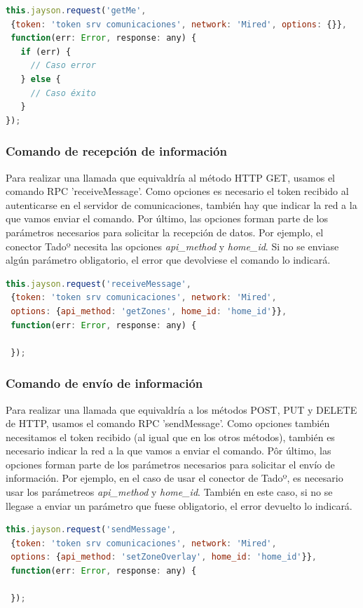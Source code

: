 \documentclass[spanish,12pt, a4paper, twoside]{paper}
\begin{document}
\begin{lstlisting}[language=Javascript]
this.jayson.request('getMe',
 {token: 'token srv comunicaciones', network: 'Mired', options: {}}, 
 function(err: Error, response: any) {
   if (err) {
     // Caso error
   } else {
     // Caso éxito
   }
});
\end{lstlisting}

\subsubsection{Comando de recepción de información}

Para realizar una llamada que equivaldría al método HTTP GET, usamos el comando RPC 'receiveMessage'. Como opciones es necesario el token recibido al autenticarse en el servidor de comunicaciones, también hay que indicar la red a la que vamos enviar el comando. Por último, las opciones forman parte de los parámetros necesarios para solicitar la recepción de datos. Por ejemplo, el conector Tadoº necesita las opciones \emph{api\_method} y \emph{home\_id}. Si no se enviase algún parámetro obligatorio, el error que devolviese el comando lo indicará.

\begin{lstlisting}[language=Javascript]
this.jayson.request('receiveMessage',
 {token: 'token srv comunicaciones', network: 'Mired',
 options: {api_method: 'getZones', home_id: 'home_id'}}, 
 function(err: Error, response: any) {
 
 });
\end{lstlisting}

\subsubsection{Comando de envío de información}

Para realizar una llamada que equivaldría a los métodos POST, PUT y DELETE de HTTP, usamos el comando RPC 'sendMessage'. Como opciones también necesitamos el token recibido (al igual que en los otros métodos), también es necesario indicar la red a la que vamos a enviar el comando. Pôr último, las opciones forman parte de los parámetros necesarios para solicitar el envío de información. Por ejemplo, en el caso de usar el conector de Tadoº, es necesario usar los parámetreos \emph{api\_method} y \emph{home\_id}. También en este caso, si no se llegase a enviar un parámetro que fuese obligatorio, el error devuelto lo indicará.

\begin{lstlisting}[language=Javascript]
this.jayson.request('sendMessage',
 {token: 'token srv comunicaciones', network: 'Mired',
 options: {api_method: 'setZoneOverlay', home_id: 'home_id'}}, 
 function(err: Error, response: any) {
 
 });
\end{lstlisting}
 
\end{document}

